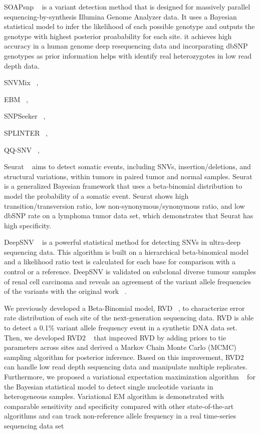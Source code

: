 \documentclass[11pt,reqno]{amsart}
\begin{document}
SOAPsnp ~\citep{Li2009} is a variant detection method that is designed for massively parallel sequencing-by-synthesis Illumina Genome Analyzer data.
It uses a Bayesian statistical model to infer the likelihood of each possible genotype and outputs the genotype with highest posterior proabability for each site.
it achieves high accuracy in a human genome deep resequencing data and incorparating dbSNP genotypes as prior information helps with identify real heterozygotes in low read depth data.

SNVMix ~\citep{Goya2010},

EBM ~\citep{Zhou2012},

SNPSeeker ~\citep{Druley2009},

SPLINTER ~\citep{Spencer2014},

QQ-SNV ~\citep{VanderBorght2015},

Seurat ~\citep{Christoforides2013} aims to detect somatic events, including SNVs, insertion/deletions, and structural variations, within tumors in paired tumor and normal samples.
Seurat is a generalized Bayesian framework that uses a beta-binomial distribution to model the probability of a somatic event.
Seurat shows high transition/transversion ratio, low non-synonymous/synonymous ratio, and low dbSNP rate on a lymphoma tumor data set, which demonstrates that Seurat has high specificity.

DeepSNV ~\citep{gerstung2012reliable} is a powerful statistical method for detecting SNVs in ultra-deep sequencing data.
This algorithm is built on a hierarchical beta-binomical model and a likelihood ratio test is calculated for each base for comparison with a control or a reference.
DeepSNV is validated on subclonal diverse tumour samples of renal cell carcinoma and reveals an agreement of the variant allele frequencies of the variants with the original work ~\citep{gerstung2012reliable}.

We previously developed a Beta-Binomial model, RVD ~\citep{Flaherty2012}, to characterize error rate distribution of each site of the next-generation sequencing data.
RVD is able to detect a 0.1\% variant allele frequency event in a synthetic DNA data set.
Then, we developed RVD2 ~\citep{He2015} that improved RVD by adding priors to tie parameters across sites and derived a Markov Chain Monte Carlo (MCMC) sampling algorithm for posterior inference.
Based on this improvement, RVD2 can handle low read depth sequencing data and manipulate multiple replicates.
Furthermore, we proposed a variational expectation maximization algorithm ~\citep{zhang2016variational} for the Bayesian statistical model to detect single nucleotide variants in heterogeneous samples.
Variational EM algorithm is demonstrated with comparable sensitivity and specificity compared with other state-of-the-art algorithms and can track non-reference allele frequency in a real time-series sequencing data set
\end{document}
